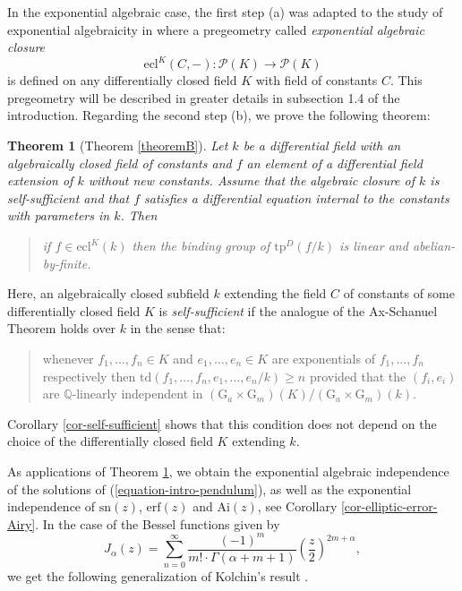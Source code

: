 \documentclass[12pt]{amsart}
\theoremstyle{definition}
\theoremstyle{plain}
\theoremstyle{exampstyle}\newtheorem{thmx}{Theorem}
\theoremstyle{exampstyle}\newtheorem{thmxbis}{Theorem}
\newcommand{\Gm}{\mathrm{G}_m}
\newcommand{\Ga}{\mathrm{G}_a}
\begin{document}
In the exponential algebraic case, the first step (a) was adapted to the study of exponential algebraicity in \cite{Kirby-semiab} where a pregeometry called {\em exponential algebraic closure}
\begin{equation}\label{equation-intro-ecl}
 \mathrm{ecl}^K(C, - ) : \mathcal P(K) \rightarrow \mathcal P(K)
\end{equation}
is defined on any differentially closed field $K$ with field of constants $C$. 
This pregeometry will be described in greater details in subsection 1.4 of the introduction. Regarding the second step (b), we prove the following theorem: 


\begin{thmx}[Theorem \ref{theoremB}]  \label{intro-thmB}
Let $k$ be a differential field with an algebraically closed field of constants and $f$ an element of a differential field extension of $k$ without new constants. Assume that the algebraic closure of $k$ is {\em self-sufficient} and that $f$ satisfies a differential equation {\em internal to the constants} with parameters in $k$. Then 
\begin{quote} if $f \in \mathrm{ecl}^K(k)$ then the binding group of $\mathrm{tp}^D(f/k)$ is linear and abelian-by-finite.
\end{quote}
\end{thmx}

Here, an algebraically closed subfield $k$ extending the field $C$ of constants of some differentially closed field $K$ is {\em self-sufficient} if the analogue of the Ax-Schanuel Theorem holds over $k$ in the sense that:

\begin{quote} 
whenever $f_1,\ldots,f_n \in K$ and $e_1,\ldots,e_n \in K$ are exponentials of $f_1,\ldots, f_n$ respectively then 
$\mathrm{td}(f_1,\ldots,f_n,e_1,\ldots,e_n/k) \geq n$
provided that the $(f_i,e_i)$ are $\mathbb{Q}$-linearly independent in $(\Ga \times \Gm)(K)/(\Ga \times \Gm)(k)$.
\end{quote} 
Corollary \ref{cor-self-sufficient} shows that this condition does not depend on the choice of the differentially closed field $K$ extending $k$. 

As applications of Theorem \ref{intro-thmB}, we obtain the exponential algebraic independence of the solutions of  (\ref{equation-intro-pendulum}), as well as the exponential independence of $\mathrm{sn}(z)$,  $\mathrm{erf}(z)$ and $\mathrm{Ai}(z)$, see Corollary \ref{cor-elliptic-error-Airy}. In the case of the Bessel functions given by 
\begin{equation*}
J_\alpha(z) = \sum_{n = 0}^\infty \frac{(-1)^m}{m! \cdot \Gamma(\alpha + m + 1)} (\frac{z}{2})^{2m+ \alpha},
\end{equation*}
we get the following generalization of Kolchin's result \cite{Kolchin}.
\end{document}
